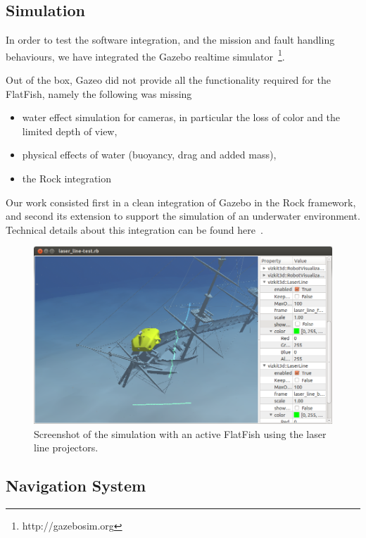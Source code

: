 \documentclass[conference]{IEEEtran}
\begin{document}
\subsection{Simulation}

In order to test the software integration, and the mission and fault handling behaviours,
we have integrated the Gazebo realtime simulator~\footnote{http://gazebosim.org}.

Out of the box, Gazeo did not provide all the functionality required for the FlatFish,
namely the following was missing
\begin{itemize}
    \item water effect simulation for cameras, in particular the loss of color and the
        limited depth of view,
    \item physical effects of water (buoyancy, drag and added mass),
    \item the Rock integration
\end{itemize}

Our work consisted first in a clean integration of Gazebo in the Rock framework, and
second its extension to support the simulation of an underwater environment. Technical
details about this integration can be found here~\cite{watanabe2015}.

\begin{figure}[!t]
	\centering
	\includegraphics[width=0.9\columnwidth]{flatfish_simulation}
	\caption{Screenshot of the simulation with an active FlatFish using the laser line 
	projectors.}
	\label{fig:simulation}
\end{figure}


\subsection{Navigation System}
\label{sec:nav}
\end{document}
